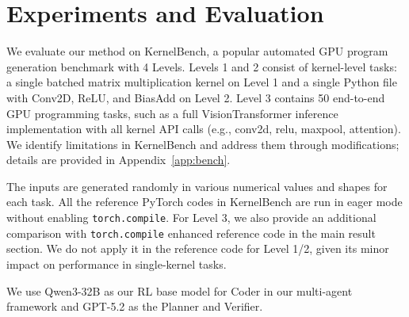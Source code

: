 \section{Experiments and Evaluation}
We evaluate our method on KernelBench\cite{kernelbench}, a popular automated GPU program generation benchmark with 4 Levels. Levels 1 and 2 consist of kernel-level tasks: a single batched matrix multiplication kernel on Level 1 and a single Python file with Conv2D, ReLU, and BiasAdd on Level 2. Level 3 contains 50 end-to-end GPU programming tasks, such as a full VisionTransformer inference implementation with all kernel API calls (e.g., conv2d, relu, maxpool, attention). We identify limitations in KernelBench and address them through modifications; details are provided in Appendix~\ref{app:bench}.



The inputs are generated randomly in various numerical values and shapes for each task. All the reference PyTorch codes in KernelBench are run in eager mode without enabling \texttt{torch.compile}. For Level 3, we also provide an additional comparison with \texttt{torch.compile} enhanced reference code in the main result section. We do not apply it in the reference code for Level 1/2, given its minor impact on performance in single-kernel tasks.



We use Qwen3-32B \cite{qwen3technicalreport,hui2024qwen2} as our RL base model for Coder in our multi-agent framework and GPT-5.2 as the Planner and Verifier. 
 
